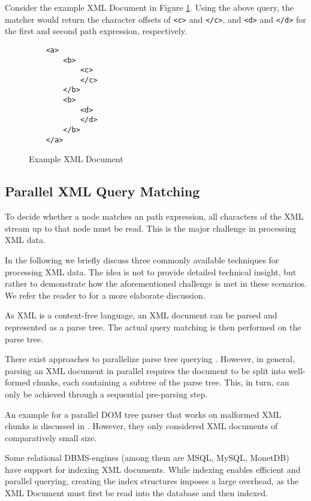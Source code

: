 Consider the example XML Document in Figure \ref{src:exampleXML}. Using the
above query, the matcher would return the character offsets of \verb;<c>; and
\verb;</c>;, and \verb;<d>; and \verb;</d>; for the first and second path
expression, respectively.

\lstset{
         numbers=left
 }

\begin{figure}[htb]
\begin{lstlisting}
    <a>
        <b>
            <c>
            </c>
        </b>
        <b>
            <d>
            </d>
        </b>
    </a>
\end{lstlisting}
\caption{Example XML Document}
\label{src:exampleXML}
\end{figure}


\subsection{Parallel XML Query Matching}
To decide whether a node matches an path expression, all characters of the XML
stream up to that node must be read. This is the major challenge in processing
XML data.

In the following we briefly discuss three commonly available techniques for
processing XML data. The idea is not to provide detailed technical insight, but
rather to demonstrate how the aforementioned challenge is met in these
scenarios. We refer the reader to \cite{Ogden2013} for a more elaborate
discussion.

 As XML is a context-free language, an XML
document can be parsed and represented as a parse tree. The actual query
matching is then performed on the parse tree.

There exist approaches to parallelize parse tree querying \cite{You11}. However,
in general, parsing an XML document in parallel requires the document to be
split into well-formed chunks, each containing a subtree of the parse tree.
This, in turn, can only be achieved through a sequential pre-parsing step.

An example for a parallel DOM tree parser that works on malformed XML chunks is
discussed in \cite{Shah09}. However, they only considered XML documents of
comparatively small size.

 Some relational DBMS-engines (among them are MSQL,
MySQL, MonetDB) have support for indexing XML documents. While indexing enables
efficient and parallel querying, creating the index structures imposes a large
overhead, as the XML Document must first be read into the database and then
indexed.

